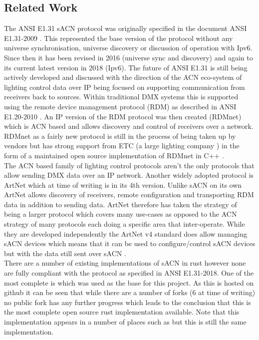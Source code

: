 \documentclass[11pt,a4paper,notitlepage]{report}
\begin{document}
	\subsection{Related Work}
	The ANSI E1.31 sACN protocol was originally specified in the document ANSI E1.31-2009 \cite{ANSI_E1.31_2009}. This represented the base version of the protocol without any universe synchronisation, universe discovery or discussion of operation with Ipv6. Since then it has been revised in 2016 (universe sync and discovery) \cite{ANSI_E1.31_2016} and again to its current latest version in 2018 (Ipv6). The future of ANSI E1.31 is still being actively developed and discussed \cite{WHAT_COMES_AFTER_SACN} with the direction of the ACN eco-system of lighting control data over IP being focused on supporting communication from receivers back to sources. Within traditional DMX systems this is supported using the remote device management protocol (RDM) as described in ANSI E1.20-2010 \cite{ANSI_E1.20_2010}. An IP version of the RDM protocol was then created (RDMnet) \cite{ANSI_E1.33_2019} which is ACN based and allows discovery and control of receivers over a network. RDMnet as a fairly new protocol is still in the process of being taken up by vendors but has strong support from ETC (a large lighting company \cite{ETC}) in the form of a maintained open source implementation of RDMnet in C++ \cite{ANSI_E1.33_IMPL}.\\
	
	The ACN based family of lighting control protocols aren't the only protocols that allow sending DMX data over an IP network. Another widely adopted protocol is ArtNet which at time of writing is in its 4th version. Unlike sACN on its own ArtNet allows discovery of receivers, remote configuration and transporting RDM data \cite{ARNET} in addition to sending data. ArtNet therefore has taken the strategy of being a larger protocol which covers many use-cases as opposed to the ACN strategy of many protocols each doing a specific area that inter-operate. While they are developed independently the ArtNet v4 standard does allow managing sACN devices which means that it can be used to configure/control sACN devices but with the data still sent over sACN \cite[Pg. 3]{ARTNET}. \\
	
	There are a number of existing implementations of sACN in rust however none are fully compliant with the protocol as specified in ANSI E1.31-2018. One of the most complete is \cite{ORIGNIAL_IMPL} which was used as the base for this project. As this is hosted on github it can be seen that while there are a number of forks (6 at time of writing) no public fork has any further progress which leads to the conclusion that this is the most complete open source rust implementation available. Note that this implementation appears in a number of places such as \cite{ORIGINAL_IMPL_RUST_DOC} but this is still the same implementation.\\
	
\end{document}
